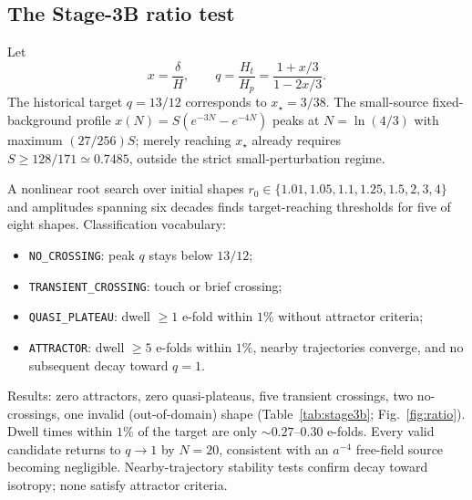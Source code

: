 \documentclass[aps,prd,reprint,superscriptaddress,nofootinbib,floatfix]{revtex4-2}
\newcommand{\Ht}{H_{t}}
\newcommand{\Hp}{H_{p}}
\begin{document}
\subsection{The Stage-3B ratio test}

Let
\begin{equation}
 x=\frac{\delta}{H},\qquad
 q=\frac{\Ht}{\Hp}=\frac{1+x/3}{1-2x/3}.
 \label{eq:q-x}
\end{equation}
The historical target \(q=13/12\) corresponds to \(x_\star=3/38\).
The small-source fixed-background profile
\(x(N)=S(e^{-3N}-e^{-4N})\) peaks at \(N=\ln(4/3)\) with maximum
\((27/256)S\); merely reaching \(x_\star\) already requires
\(S\ge 128/171\simeq 0.7485\), outside the strict small-perturbation regime.

A nonlinear root search over initial shapes
\(r_0\in\{1.01,1.05,1.1,1.25,1.5,2,3,4\}\) and amplitudes spanning six decades
finds target-reaching thresholds for five of eight shapes.
Classification vocabulary:
\begin{itemize}
\item \texttt{NO\_CROSSING}: peak \(q\) stays below \(13/12\);
\item \texttt{TRANSIENT\_CROSSING}: touch or brief crossing;
\item \texttt{QUASI\_PLATEAU}: dwell \(\ge 1\) e-fold within \(1\%\) without
attractor criteria;
\item \texttt{ATTRACTOR}: dwell \(\ge 5\) e-folds within \(1\%\), nearby
trajectories converge, and no subsequent decay toward \(q=1\).
\end{itemize}
Results: zero attractors, zero quasi-plateaus, five transient crossings,
two no-crossings, one invalid (out-of-domain) shape
(Table~\ref{tab:stage3b}; Fig.~\ref{fig:ratio}).
Dwell times within \(1\%\) of the target are only
\(\sim 0.27\)--\(0.30\) e-folds.
Every valid candidate returns to \(q\to 1\) by \(N=20\), consistent with an
\(a^{-4}\) free-field source becoming negligible.
Nearby-trajectory stability tests confirm decay toward isotropy; none satisfy
attractor criteria.
\end{document}
